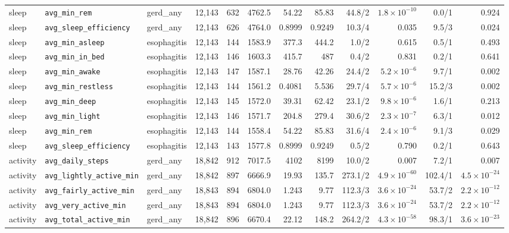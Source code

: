 \documentclass[11pt]{article}
\newcommand{\code}[1]{\texttt{\small #1}}
\begin{document}
\begin{longtable}{@{}p{1.4cm}p{2.9cm}p{1.7cm}rrrr rrrr r@{}}
sleep & \code{avg\_min\_rem} & gerd\_any & 12{,}143 & 632 & 4762.5 & 54.22 & 85.83 & 44.8/2 & $1.8\times10^{-10}$ & 0.0/1 & 0.924 \\
sleep & \code{avg\_sleep\_efficiency} & gerd\_any & 12{,}143 & 626 & 4764.0 & 0.8999 & 0.9249 & 10.3/4 & 0.035 & 9.5/3 & 0.024 \\
sleep & \code{avg\_min\_asleep} & esophagitis & 12{,}143 & 144 & 1583.9 & 377.3 & 444.2 & 1.0/2 & 0.615 & 0.5/1 & 0.493 \\
sleep & \code{avg\_min\_in\_bed} & esophagitis & 12{,}143 & 146 & 1603.3 & 415.7 &   487 & 0.4/2 & 0.831 & 0.2/1 & 0.641 \\
sleep & \code{avg\_min\_awake} & esophagitis & 12{,}143 & 147 & 1587.1 & 28.76 & 42.26 & 24.4/2 & $5.2\times10^{-6}$ & 9.7/1 & 0.002 \\
sleep & \code{avg\_min\_restless} & esophagitis & 12{,}143 & 144 & 1561.2 & 0.4081 & 5.536 & 29.7/4 & $5.7\times10^{-6}$ & 15.2/3 & 0.002 \\
sleep & \code{avg\_min\_deep} & esophagitis & 12{,}143 & 145 & 1572.0 & 39.31 & 62.42 & 23.1/2 & $9.8\times10^{-6}$ & 1.6/1 & 0.213 \\
sleep & \code{avg\_min\_light} & esophagitis & 12{,}143 & 146 & 1571.7 & 204.8 & 279.4 & 30.6/2 & $2.3\times10^{-7}$ & 6.3/1 & 0.012 \\
sleep & \code{avg\_min\_rem} & esophagitis & 12{,}143 & 144 & 1558.4 & 54.22 & 85.83 & 31.6/4 & $2.4\times10^{-6}$ & 9.1/3 & 0.029 \\
sleep & \code{avg\_sleep\_efficiency} & esophagitis & 12{,}143 & 143 & 1577.8 & 0.8999 & 0.9249 & 0.5/2 & 0.790 & 0.2/1 & 0.643 \\
activity & \code{avg\_daily\_steps} & gerd\_any & 18{,}842 & 912 & 7017.5 &  4102 &  8199 & 10.0/2 & 0.007 & 7.2/1 & 0.007 \\
activity & \code{avg\_lightly\_active\_min} & gerd\_any & 18{,}842 & 897 & 6666.9 & 19.93 & 135.7 & 273.1/2 & $4.9\times10^{-60}$ & 102.4/1 & $4.5\times10^{-24}$ \\
activity & \code{avg\_fairly\_active\_min} & gerd\_any & 18{,}843 & 894 & 6804.0 & 1.243 &  9.77 & 112.3/3 & $3.6\times10^{-24}$ & 53.7/2 & $2.2\times10^{-12}$ \\
activity & \code{avg\_very\_active\_min} & gerd\_any & 18{,}843 & 894 & 6804.0 & 1.243 &  9.77 & 112.3/3 & $3.6\times10^{-24}$ & 53.7/2 & $2.2\times10^{-12}$ \\
activity & \code{avg\_total\_active\_min} & gerd\_any & 18{,}842 & 896 & 6670.4 & 22.12 & 148.2 & 264.2/2 & $4.3\times10^{-58}$ & 98.3/1 & $3.6\times10^{-23}$ \\

\end{longtable}
\end{document}
